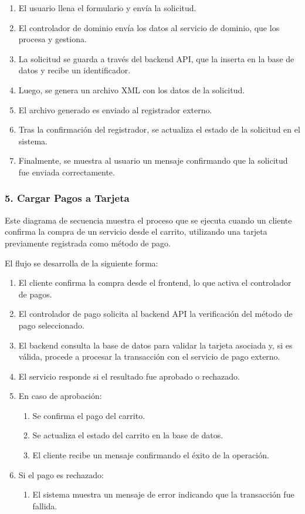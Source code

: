 \begin{enumerate}
\item El usuario llena el formulario y envía la solicitud.
\item El controlador de dominio envía los datos al servicio de dominio, que los procesa y gestiona.
\item La solicitud se guarda a través del backend API, que la inserta en la base de datos y recibe un identificador.
\item Luego, se genera un archivo XML con los datos de la solicitud.
\item El archivo generado es enviado al registrador externo.
\item Tras la confirmación del registrador, se actualiza el estado de la solicitud en el sistema.
\item Finalmente, se muestra al usuario un mensaje confirmando que la solicitud fue enviada correctamente.
\end{enumerate}

\subsubsection*{5. Cargar Pagos a Tarjeta}
Este diagrama de secuencia muestra el proceso que se ejecuta cuando un cliente confirma la compra de un servicio desde el carrito, utilizando una tarjeta previamente registrada como método de pago.

El flujo se desarrolla de la siguiente forma:

 \begin{enumerate}
 \item El cliente confirma la compra desde el frontend, lo que activa el controlador de pagos.
 \item El controlador de pago solicita al backend API la verificación del método de pago seleccionado.
 \item El backend consulta la base de datos para validar la tarjeta asociada y, si es válida, procede a procesar la transacción con el servicio de pago externo.
 \item El servicio responde si el resultado fue aprobado o rechazado.
 \item En caso de aprobación:
 \begin{enumerate}
     \item Se confirma el pago del carrito.
     \item Se actualiza el estado del carrito en la base de datos.
     \item El cliente recibe un mensaje confirmando el éxito de la operación.
 \end{enumerate}

 \item Si el pago es rechazado:
    \begin{enumerate}
    	\item El sistema muestra un mensaje de error indicando que la transacción fue fallida.
    \end{enumerate}
 \end{enumerate}

